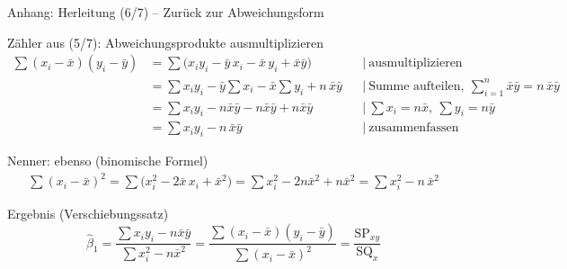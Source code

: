 \documentclass[aspectratio=169,11pt]{beamer}
\newcommand{\tsum}{\textstyle\sum}
\newcommand{\SQx}{\text{SQ}_x}
\newcommand{\SPxy}{\text{SP}_{xy}}
\begin{document}
\begin{frame}{Anhang: Herleitung (6/7) -- Zurück zur Abweichungsform}
  \begin{block}{Zähler aus (5/7): Abweichungsprodukte ausmultiplizieren}
    \vspace{-8pt}
    \footnotesize
    \begin{align*}
      \tsum (x_i - \bar{x})(y_i - \bar{y})
        &= \tsum \bigl(x_i y_i - \bar{y}\,x_i - \bar{x}\,y_i + \bar{x}\bar{y}\bigr)
         && \mid\ \text{ausmultiplizieren} \\
        &= \tsum x_i y_i - \bar{y}\tsum x_i - \bar{x}\tsum y_i + n\,\bar{x}\bar{y}
         && \mid\ \text{Summe aufteilen}, \ \tsum_{i=1}^{n} \bar{x}\bar{y} = n\,\bar{x}\bar{y} \\
        &= \tsum x_i y_i - n\bar{x}\bar{y} - n\bar{x}\bar{y} + n\bar{x}\bar{y}
         && \mid\ \tsum x_i = n\bar{x}, \ \tsum y_i = n\bar{y} \\
        &= \tsum x_i y_i - n\,\bar{x}\bar{y}
         && \mid\ \text{zusammenfassen}
    \end{align*}
    \vspace{-14pt}
  \end{block}

  \begin{block}{Nenner: ebenso (binomische Formel)}
    \vspace{-8pt}
    \footnotesize
    \begin{align*}
      \tsum (x_i - \bar{x})^{2}
        = \tsum \bigl(x_i^{2} - 2\bar{x}\,x_i + \bar{x}^{2}\bigr)
        = \tsum x_i^{2} - 2n\bar{x}^{2} + n\bar{x}^{2}
        = \tsum x_i^{2} - n\,\bar{x}^{2}
    \end{align*}
    \vspace{-14pt}
  \end{block}

  \begin{exampleblock}{Ergebnis (Verschiebungssatz)}
    \[
      \hat{\beta}_1 = \frac{\tsum x_i y_i - n\bar{x}\bar{y}}{\tsum x_i^{2} - n\bar{x}^{2}}
                    = \frac{\tsum (x_i - \bar{x})(y_i - \bar{y})}{\tsum (x_i - \bar{x})^{2}}
                    = \frac{\SPxy}{\SQx}
    \]
    \vspace{-10pt}
  \end{exampleblock}
\end{frame}
\end{document}
